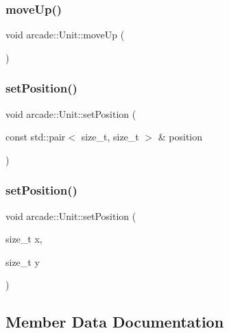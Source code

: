 \subsubsection{\texorpdfstring{move\+Up()}{moveUp()}}
{\footnotesize\ttfamily void arcade\+::\+Unit\+::move\+Up (\begin{DoxyParamCaption}{ }\end{DoxyParamCaption})\hspace{0.3cm}{\ttfamily [virtual]}}

\mbox{\label{classarcade_1_1_unit_ab53d6d5f92e49bfe5f500307e299599d}} 
\subsubsection{\texorpdfstring{set\+Position()}{setPosition()}\hspace{0.1cm}{\footnotesize\ttfamily [1/2]}}
{\footnotesize\ttfamily void arcade\+::\+Unit\+::set\+Position (\begin{DoxyParamCaption}\item[{const std\+::pair$<$ size\+\_\+t, size\+\_\+t $>$ \&}]{position }\end{DoxyParamCaption})}

\mbox{\label{classarcade_1_1_unit_a5b6beb5c96e174caf0ba0f0d14ccde8b}} 
\subsubsection{\texorpdfstring{set\+Position()}{setPosition()}\hspace{0.1cm}{\footnotesize\ttfamily [2/2]}}
{\footnotesize\ttfamily void arcade\+::\+Unit\+::set\+Position (\begin{DoxyParamCaption}\item[{size\+\_\+t}]{x,  }\item[{size\+\_\+t}]{y }\end{DoxyParamCaption})}



\subsection{Member Data Documentation}
\mbox{\label{classarcade_1_1_unit_ac9e7559836ec4e3b3bdcde00d3e3bb97}} 
